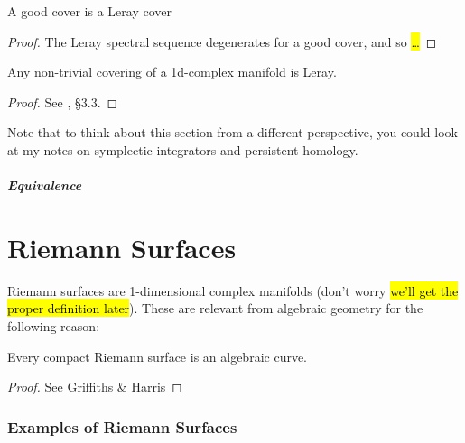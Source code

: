 \documentclass{article}
\begin{document}
\begin{prop}
	A good cover is a Leray cover
\end{prop}
\begin{proof}
	The Leray spectral sequence degenerates for a good cover, and so \hl{\dots}
\end{proof}

\begin{prop}
	Any non-trivial covering of a 1d-complex manifold is Leray.
\end{prop}
\begin{proof}
	See \cite{Ward1991}, \S 3.3. 
\end{proof}

\begin{remark}
	Note that to think about this section from a different perspective, you could look at my notes on symplectic integrators and persistent homology. 
\end{remark}
\subsubsection{Equivalence}

\part{Riemann Surfaces}
Riemann surfaces are 1-dimensional complex manifolds (don't worry \hl{we'll get the proper definition later}). These are relevant from algebraic geometry for the following reason:
\begin{theorem}
	Every compact Riemann surface is an algebraic curve.
\end{theorem}
\begin{proof}
	See Griffiths \& Harris 
\end{proof}

\section{Examples of Riemann Surfaces}
\end{document}

